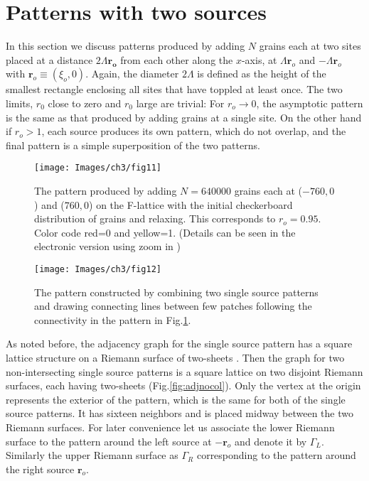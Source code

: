\documentclass[11pt,a4paper]{book}
\begin{document}
\section{Patterns with two sources}\label{ch3.6}
In this section we discuss patterns produced by adding $N$ grains each at two
sites placed at a distance $2\Lambda\mathbf{r_o}$ from each other along the $x$-axis,
at $\Lambda\mathbf{r}_{o}$ and $-\Lambda\mathbf{r}_{o}$ with $\mathbf{r}_{o}\equiv \left( \xi_{o}, 0 \right)$. 
Again, the diameter $2\Lambda$ is defined as the height of the smallest
rectangle enclosing all sites that have toppled at least once.
The two limits, $r_0$ close to zero and $r_0$ large are trivial:
For $r_o\rightarrow 0$, the asymptotic pattern is the same as that produced by 
adding grains at a single site. On the other hand if $r_{o} > 1$,  each source produces its own pattern, which do not overlap, 
and the final pattern is a simple superposition of the two patterns. 
\begin{figure}
\begin{center}
\texttt{[image: Images/ch3/fig11]}
\caption{ The pattern produced by adding $N=640000$ grains each at ($-760,0$) and 
($760,0$) on the F-lattice with the initial checkerboard distribution of grains and 
relaxing. This corresponds to $r_{o}=0.95$. Color code red=0 and yellow=1.
(Details can be seen in the electronic version using zoom in )}
\label{fig:twosource}
\end{center}
\end{figure}
\begin{figure}[t]
\begin{center}
\texttt{[image: Images/ch3/fig12]}
\caption{ The pattern constructed by combining two single source patterns and drawing
connecting lines between few patches following the connectivity in the pattern in 
Fig.\ref{fig:twosource}.}
\label{fig:edited}
\end{center}
\end{figure}

As noted before, the adjacency graph for the single source
pattern has a square lattice structure on a Riemann surface of two-sheets \cite{myepl}. Then
the graph for two non-intersecting single source patterns is a square 
lattice on two disjoint Riemann surfaces, each having two-sheets 
(Fig.\ref{fig:adjnocol}). Only the vertex at the origin
represents the exterior of the pattern, which is the same for both of the
single source patterns. It has sixteen neighbors and is placed
midway between the two Riemann surfaces.
For later convenience let us associate the lower Riemann surface to the pattern
around the left source at $-\mathbf{r}_o$ and denote it by $\Gamma_L$. Similarly the
upper Riemann surface as $\Gamma_R$ corresponding to the pattern around
the right source $\mathbf{r}_o$.
\end{document}
